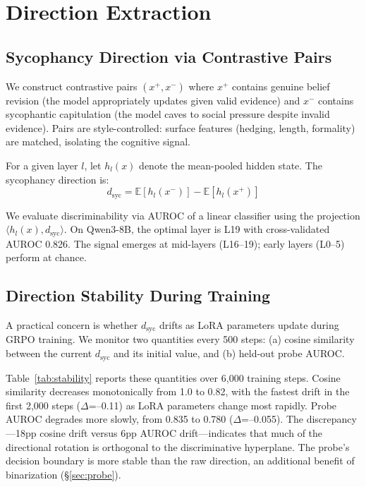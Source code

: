 \documentclass[11pt,a4paper]{article}
\newcommand{\dsyc}{d_{\text{syc}}}
\begin{document}
\section{Direction Extraction}
\label{sec:direction}

\subsection{Sycophancy Direction via Contrastive Pairs}

We construct contrastive pairs $(x^+, x^-)$ where $x^+$ contains genuine belief revision (the model appropriately updates given valid evidence) and $x^-$ contains sycophantic capitulation (the model caves to social pressure despite invalid evidence). Pairs are style-controlled: surface features (hedging, length, formality) are matched, isolating the cognitive signal.

For a given layer $l$, let $h_l(x)$ denote the mean-pooled hidden state. The sycophancy direction is:
\begin{equation}
    \dsyc = \mathbb{E}[h_l(x^-)] - \mathbb{E}[h_l(x^+)]
\end{equation}

We evaluate discriminability via AUROC of a linear classifier using the projection $\langle h_l(x), \dsyc \rangle$. On Qwen3-8B, the optimal layer is L19 with cross-validated AUROC 0.826. The signal emerges at mid-layers (L16--19); early layers (L0--5) perform at chance.

\subsection{Direction Stability During Training}
\label{sec:stability}

A practical concern is whether $\dsyc$ drifts as LoRA parameters update during GRPO training. We monitor two quantities every 500 steps: (a) cosine similarity between the current $\dsyc$ and its initial value, and (b) held-out probe AUROC.

Table~\ref{tab:stability} reports these quantities over 6{,}000 training steps. Cosine similarity decreases monotonically from 1.0 to 0.82, with the fastest drift in the first 2{,}000 steps ($\Delta$=--0.11) as LoRA parameters change most rapidly. Probe AUROC degrades more slowly, from 0.835 to 0.780 ($\Delta$=--0.055). The discrepancy---18pp cosine drift versus 6pp AUROC drift---indicates that much of the directional rotation is orthogonal to the discriminative hyperplane. The probe's decision boundary is more stable than the raw direction, an additional benefit of binarization (\S\ref{sec:probe}).
\end{document}
